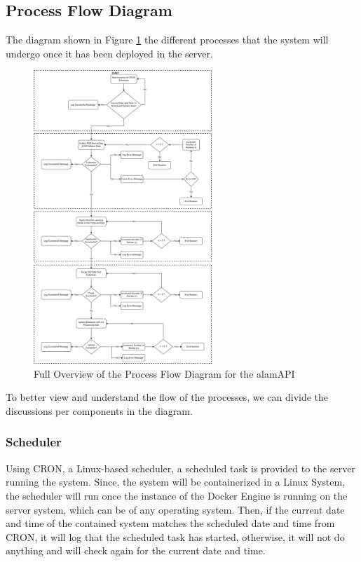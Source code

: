 \subsection{Process Flow Diagram}
\label{subsec:process_flow}
The diagram shown in Figure \ref{fig:process_flowchart} the different processes 
that the system will undergo once it has been deployed in the server.

\begin{figure}[ht]
    \centering
    \includegraphics[width=0.6\textwidth]{./assets/ProcessFlowchart.png}
    \caption{Full Overview of the Process Flow Diagram for the alamAPI}
    \label{fig:process_flowchart}
\end{figure}
\FloatBarrier

To better view and understand the flow of the processes, 
we can divide the discussions per components in the diagram.

\subsubsection{Scheduler}
\label{subsubsc:scheduler}
Using CRON, a Linux-based scheduler, a 
scheduled task is provided to the server running the system. Since, 
the system will be containerized in a Linux System, the scheduler will 
run once the instance of the Docker Engine is running on the server system, 
which can be of any operating system. Then, if the current date and time of 
the contained system matches the scheduled date and time from CRON, it will 
log that the scheduled task has started, otherwise, it will not do anything 
and will check again for the current date and time.
\hfill \\

